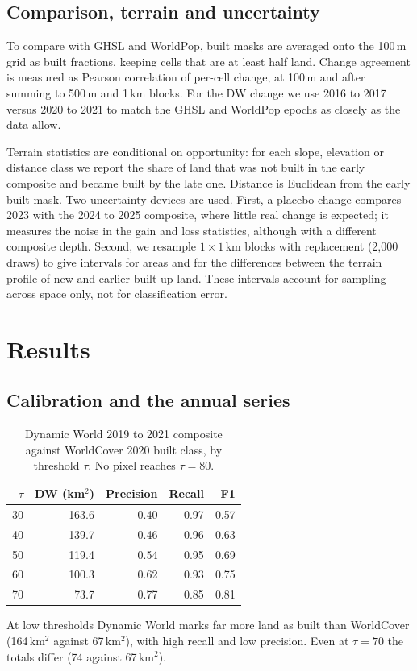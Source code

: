 \documentclass[conference]{IEEEtran}
\begin{document}
\subsection{Comparison, terrain and uncertainty}
To compare with GHSL and WorldPop, built masks are averaged onto the 100\,m grid as built fractions, keeping cells that are at least half land. Change agreement is measured as Pearson correlation of per-cell change, at 100\,m and after summing to 500\,m and 1\,km blocks. For the DW change we use 2016 to 2017 versus 2020 to 2021 to match the GHSL and WorldPop epochs as closely as the data allow.

Terrain statistics are conditional on opportunity: for each slope, elevation or distance class we report the share of land that was not built in the early composite and became built by the late one. Distance is Euclidean from the early built mask. Two uncertainty devices are used. First, a placebo change compares 2023 with the 2024 to 2025 composite, where little real change is expected; it measures the noise in the gain and loss statistics, although with a different composite depth. Second, we resample $1\times1$\,km blocks with replacement (2{,}000 draws) to give intervals for areas and for the differences between the terrain profile of new and earlier built-up land. These intervals account for sampling across space only, not for classification error.

\section{Results}

\subsection{Calibration and the annual series}
\label{sec:growth}
\begin{table}[t]
\centering
\caption{Dynamic World 2019 to 2021 composite against WorldCover 2020 built class, by threshold $\tau$. No pixel reaches $\tau=80$.}
\label{tab:cal}
\begin{tabular}{rrrrr}
\toprule
$\tau$ & DW (km$^2$) & Precision & Recall & F1 \\
\midrule
30 & 163.6 & 0.40 & 0.97 & 0.57 \\
40 & 139.7 & 0.46 & 0.96 & 0.63 \\
50 & 119.4 & 0.54 & 0.95 & 0.69 \\
60 & 100.3 & 0.62 & 0.93 & 0.75 \\
70 & 73.7 & 0.77 & 0.85 & 0.81 \\
\bottomrule
\end{tabular}
\end{table}
At low thresholds Dynamic World marks far more land as built than WorldCover (164\,km$^2$ against 67\,km$^2$), with high recall and low precision. Even at $\tau=70$ the totals differ (74 against 67\,km$^2$).
\end{document}
